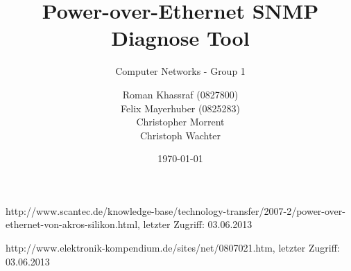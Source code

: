\documentclass[a4paper, 12pt]{scrartcl}
\title{Power-over-Ethernet SNMP Diagnose Tool}
\subtitle{Computer Networks - Group 1}
\author{Roman Khassraf (0827800)\\ Felix Mayerhuber (0825283) \\ Christopher Morrent \\ Christoph Wachter }
\date{\today}
\begin{document}
\maketitle







\begin{thebibliography}{4}

 http://www.scantec.de/knowledge-base/technology-transfer/2007-2/power-over-ethernet-von-akros-silikon.html, letzter Zugriff: 03.06.2013

 http://www.elektronik-kompendium.de/sites/net/0807021.htm, letzter Zugriff: 03.06.2013

\end{thebibliography}
\end{document}
